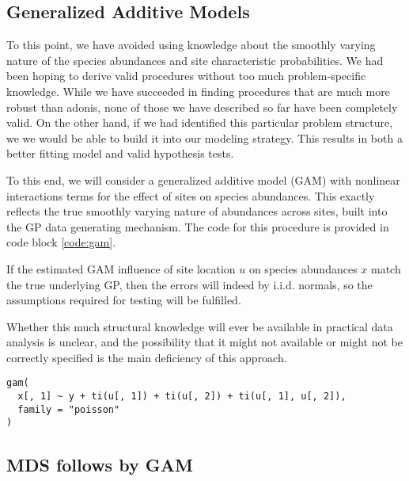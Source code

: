\documentclass{article}
\newenvironment{code}{\captionsetup{type=listing}}{}
\begin{document}
\subsection{Generalized Additive Models}
\label{subsec:generalized_additive_models}

To this point, we have avoided using knowledge about the smoothly varying nature
of the species abundances and site characteristic probabilities. We had been
hoping to derive valid procedures without too much problem-specific knowledge.
While we have succeeded in finding procedures that are much more robust than
adonis, none of those we have described so far have been completely valid. On
the other hand, if we had identified this particular problem structure, we we
would be able to build it into our modeling strategy. This results in both a
better fitting model and valid hypothesis tests.

To this end, we will consider a generalized additive model (GAM) with nonlinear
interactions terms for the effect of sites on species abundances. This exactly
reflects the true smoothly varying nature of abundances across sites, built into
the GP data generating mechanism. The code for this procedure is provided in
code block \ref{code:gam}.

If the estimated GAM influence of site location $u$ on species abundances $x$
match the true underlying GP, then the errors will indeed by i.i.d. normals, so
the assumptions required for testing will be fulfilled.

Whether this much structural knowledge will ever be available in practical data
analysis is unclear, and the possibility that it might not available or might
not be correctly specified is the main deficiency of this approach.

\begin{code}
\begin{verbatim}
gam(
  x[, 1] ~ y + ti(u[, 1]) + ti(u[, 2]) + ti(u[, 1], u[, 2]),
  family = "poisson"
)
\end{verbatim}
\label{code:gam}
\end{code}

\subsection{MDS follows by GAM}
\label{subsec:mds_followed_by_gam}
\end{document}
